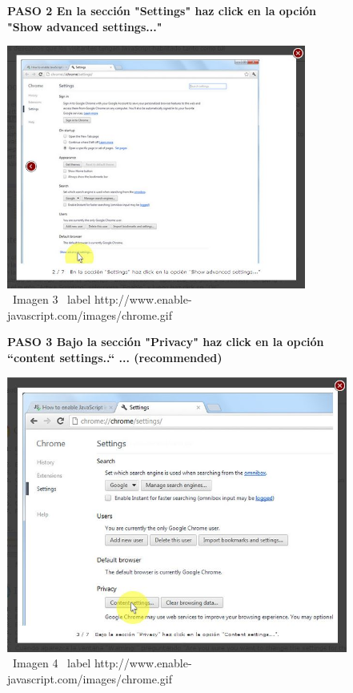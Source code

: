 \documentclass[11pt]{article} %
\begin{document}
\begin{figure}
\begin{center}
\begin{center}


\bf PASO 2
En la sección "Settings" haz click en la 
opción "Show advanced settings..."
\end{center}
\includegraphics[height=8cm, width=8 cm] {imagenes/chrome 02.jpg}
\newline
\  Imagen 3
\ label { http://www.enable-javascript.com/images/chrome.gif }
\newline




\begin{center}
\bf PASO 3
Bajo la sección "Privacy" haz click en la opción 
``content settings..`` ... (recommended)
\newline
\end{center}
\includegraphics[height=8 cm, width=8 cm] {imagenes/chrome 03.jpg}
\newline
\ Imagen 4
\ label { http://www.enable-javascript.com/images/chrome.gif }
\newline


\end{center}
\end{figure}
\end{document}
